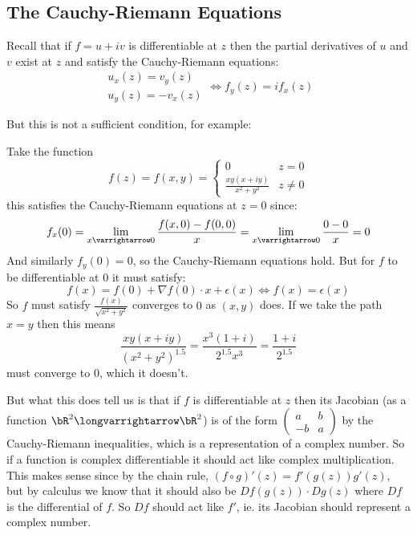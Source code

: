 \documentclass[10pt]{article}
\def\pmat#1{\begin{pmatrix} #1 \end{pmatrix}}
\begin{document}


\bigskip

\subsection{The Cauchy-Riemann Equations}

Recall that if $f=u+iv$ is differentiable at $z$ then the partial derivatives of $u$ and $v$ exist at $z$ and satisfy the Cauchy-Riemann equations:
\[ \begin{gathered} u_x(z) = v_y(z) \\ u_y(z) = -v_x(z) \end{gathered} \iff f_y(z) = if_x(z) \]

But this is not a sufficient condition, for example:
\begin{exam*}

    Take the function
    \[ f(z) = f(x,y) = \begin{cases} 0 & z=0 \\ \frac{xy(x+iy)}{x^2+y^2} & z\neq0 \end{cases} \]
    this satisfies the Cauchy-Riemann equations at $z=0$ since:
    \[ f_x(0) = \lim_{x\varrightarrow0}\frac{f(x,0)-f(0,0)}x = \lim_{x\varrightarrow0}\frac{0-0}x = 0 \]
    And similarly $f_y(0)=0$, so the Cauchy-Riemann equations hold.
    But for $f$ to be differentiable at $0$ it must satisfy:
    \[ f(x) = f(0) + \nabla f(0)\cdot x + \epsilon(x) \iff f(x) = \epsilon(x) \]
    So $f$ must satisfy $\frac{f(x)}{\sqrt{x^2+y^2}}$ converges to $0$ as $(x,y)$ does.
    If we take the path $x=y$ then this means
    \[ \frac{xy(x+iy)}{(x^2+y^2)^{1.5}} = \frac{x^3(1+i)}{2^{1.5}x^3} = \frac{1+i}{2^{1.5}} \]
    must converge to $0$, which it doesn't.

\end{exam*}

But what this does tell us is that  if $f$ is differentiable at $z$ then its Jacobian (as a function $\bR^2\longvarrightarrow\bR^2$) is of the form $\pmat{a & b \\ -b & a}$ by the Cauchy-Riemann
inequalities, which is a representation of a complex number.
So if a function is complex differentiable it should act like complex multiplication.
This makes sense since by the chain rule, $(f\circ g)'(z)=f'(g(z))g'(z)$, but by calculus we know that it should also be $Df(g(z))\cdot Dg(z)$ where $Df$ is the differential of $f$.
So $Df$ should act like $f'$, ie. its Jacobian should represent a complex number.
\end{document}
